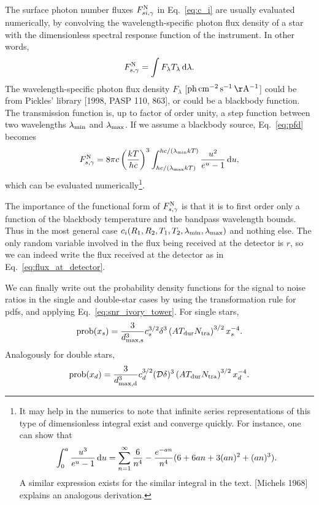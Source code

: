 \documentclass{emulateapj}
\begin{document}
The surface photon number fluxes $F^{\rm N}_{si,\gamma}$ in Eq.~\ref{eq:c_i} 
are usually evaluated numerically, by convolving the wavelength-specific photon 
flux density of a star with the dimensionless spectral response function of the 
instrument. In other words,
\begin{equation}
F^{\rm N}_{s,\gamma} = \int F_\lambda T_\lambda \, {\rm d}\lambda.
\label{eq:pfd}
\end{equation}
The wavelength-specific photon flux density $F_\lambda$ [${\rm 
ph\,cm^{-2}\,s^{-1}\,\AA^{-1}}$] could be from Pickles' library [1998, PASP 
110, 863], or could be a blackbody function. The transmission function is, up 
to factor of order 
unity, a step function between two wavelengths $\lambda_{\rm min}$ and 
$\lambda_{\rm max}$.
If we assume a blackbody source, Eq.~\ref{eq:pfd} becomes
\begin{equation}
F^{\rm N}_{s,\gamma} = 8\pi c \left(\frac{k T}{h c}\right)^3 
\int_{hc/(\lambda_{\rm max} kT)}^{hc/(\lambda_{\rm min} kT)}
\frac{u^2}{e^u - 1} \,{\rm d} u,
\end{equation}
which can be evaluated numerically\footnote{It may help in the numerics to note 
that infinite series representations of this type of dimensionless integral 
exist and converge quickly. For instance, one can show that
\begin{equation}
\int_{0}^{a} \frac{u^3}{e^u -1} \,{\rm d}u = \sum_{n=1}^{\infty} \frac{6}{n^4} 
- \frac{e^{-an}}{n^4} (6 + 6an + 3(an)^2 + (an)^3).
\nonumber
\end{equation}
A similar expression exists for the similar integral in the text. 
[Michels 1968] explains an analogous derivation.
}.

The importance of the functional form of $F^{\rm N}_{s,\gamma}$ is that it is 
to first order only a function of the blackbody temperature and the bandpass 
wavelength bounds.
Thus in the most general case $c_i(R_1, R_2, T_1, T_2, \lambda_{\rm min}, 
\lambda_{\rm max})$ and nothing else.
The only random variable involved in the flux being received at the detector is 
$r$, so we can indeed write the flux received at the detector as in 
Eq.~\ref{eq:flux_at_detector}.

We can finally write out the probability density functions for the signal to 
noise ratios in the single and double-star cases by using the transformation 
rule for pdfs, and applying Eq.~\ref{eq:snr_ivory_tower}.
For single stars,
\begin{equation}
{\rm prob}(x_s) = \frac{3}{d_{\rm max, s}^3} c_s^{3/2} \delta^3 \left( A T_{\rm 
dur} N_{\rm tra}\right)^{3/2} x_s^{-4}.
\label{eq:prob_xs}
\end{equation}
Analogously for double stars,
\begin{equation}
{\rm prob}(x_d) = \frac{3}{d_{\rm max, d}^3} c_d^{3/2} (\mathcal{D}\delta)^3 
\left( A T_{\rm dur} N_{\rm tra}\right)^{3/2} x_d^{-4}.
\label{eq:prob_xd}
\end{equation}
\end{document}
